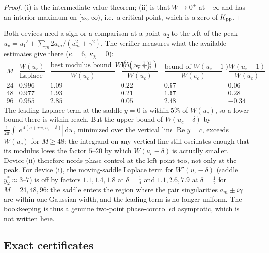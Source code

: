 \documentclass[11pt]{article}
\theoremstyle{definition}
\theoremstyle{remark}
\newcommand{\dd}{\,\mathrm d}
\begin{document}
\begin{proof}
(i) is the intermediate value theorem; (ii) is that \(W\to0^+\) at
\(+\infty\) and has an interior maximum on \([u_2,\infty)\), i.e.\ a
critical point, which is a zero of \(K_{\rm pp}\).
\end{proof}

Both devices need a sign or a comparison at a point \(u_2\) to the left
of the peak \(u_c=u_1'+\sum_m2a_m/(a_m^2+\gamma^2)\).  The verifier
measures what the available estimates give there (\(\kappa=6\),
\(\kappa_\chi=0\)):
\begin{equation}
\begin{array}{c|c|cc|cc}
 M & \dfrac{W(u_c)}{\text{Laplace leading}} &
 \dfrac{\text{best modulus bound of }W(u_c-\tfrac12)}{W(u_c)} & \dfrac{W(u_c-\tfrac12)}{W(u_c)} &
 \dfrac{\text{bound of }W(u_c-1)}{W(u_c)} & \dfrac{W(u_c-1)}{W(u_c)}\\ \hline
 24 & 0.996 & 1.09 & 0.22 & 0.67 & 0.06\\
 48 & 0.977 & 1.93 & 0.21 & 1.67 & 0.28\\
 96 & 0.955 & 2.85 & 0.05 & 2.48 & -0.34
\end{array}
\label{eq:f2v83-table}
\end{equation}
The leading Laplace term at the saddle \(y=0\) is within \(5\%\) of
\(W(u_c)\), so a lower bound there is within reach.  But the upper bound
of \(W(u_c-\delta)\) by \(\frac1{2\pi}\int|e^{\Lambda(c+iw;u_c-\delta)}|\dd w\),
minimized over the vertical line \(\operatorname{Re}y=c\), exceeds
\(W(u_c)\) for \(M\ge48\): the integrand on any vertical line still
oscillates enough that its modulus loses the factor \(5\)--\(20\) by which
\(W(u_c-\delta)\) is actually smaller.  Device (ii) therefore needs
phase control at the left point too, not only at the peak.  For device
(i), the moving-saddle Laplace term for \(W'(u_c-\delta)\) (saddle
\(y_2^*\approx3\)--\(7\)) is off by factors \(1.1,1.4,1.8\) at
\(\delta=\tfrac14\) and \(1.1,2.6,7.9\) at \(\delta=\tfrac12\) for
\(M=24,48,96\): the saddle enters the region where the pair
singularities \(a_m\pm i\gamma\) are within one Gaussian width, and the
leading term is no longer uniform.  The bookkeeping is thus a genuine
two-point phase-controlled asymptotic, which is not written here.

\subsection{Exact certificates}
\end{document}
